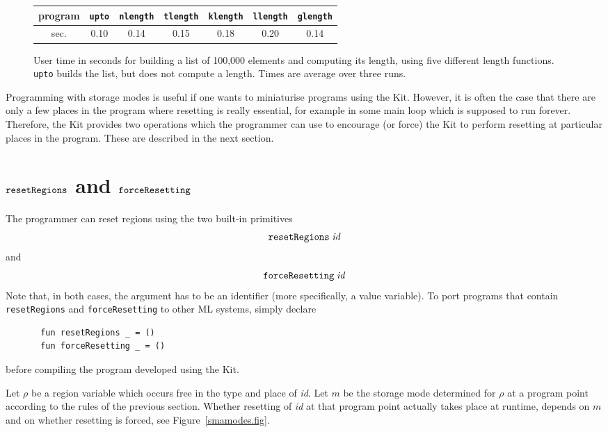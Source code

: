 \documentclass[12pt]{book}
\begin{document}
\begin{figure}
\begin{center}
\begin{tabular}{|c|c|c|c|c|c|c|}\hline
program      & {\tt upto} & {\tt nlength} & {\tt tlength} & {\tt klength} & {\tt llength} & {\tt glength} \\ \hline
sec. & 0.10 & 0.14 & 0.15 & 0.18 & 0.20 & 0.14\\ \hline
\end{tabular}
\end{center}
\caption{User time in seconds for building a list of 100,000 elements and
computing its length, using five different length functions. {\tt upto} builds
the list, but does not compute a length. Times are average
over three runs.}
\label{length.timing.fig}
\end{figure}

Programming with storage modes is useful if one wants to miniaturise 
programs using the Kit. However, it is often the case that there are only
a few places in the program where resetting is really essential, for example
in some main loop which is supposed to run forever. Therefore, the Kit provides
two operations which the programmer can use to encourage (or force) 
the Kit to perform resetting at particular places in the program. 
These are described in the next
section.

\section{$\hbox{\tt resetRegions}$ and $\hbox{\tt forceResetting}$}
The programmer can reset regions using the two built-in primitives
$$\hbox{\tt resetRegions}\; {\it id}$$
and 
$$\hbox{\tt forceResetting}\; {\it id}$$
Note that, in both cases, the argument has to be an identifier (more specifically, 
a value variable). To port programs that contain {\tt resetRegions}
and {\tt forceResetting} to other ML systems, simply declare
\begin{verbatim}
       fun resetRegions _ = ()
       fun forceResetting _ = ()
\end{verbatim}
before compiling the program developed using the Kit.

Let $\rho$ be a region variable which occurs free in the type and
place of {\it id}.  Let $m$ be the storage mode determined for $\rho$
at a program point according to the rules of the previous section.
Whether resetting of {\it id} at that program point actually takes
place at runtime, depends on $m$ and on whether resetting is forced,
see Figure~\ref{smamodes.fig}.  
\medskip
\end{document}
